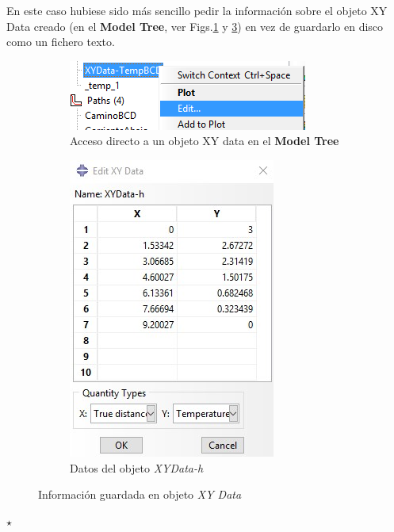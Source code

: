 \begin{itemize}
   En este caso hubiese sido más sencillo pedir la información sobre
   el objeto XY Data creado (en el \textbf{Model Tree}, ver
   Figs.\ref{post38} y \ref{post39}) en vez de guardarlo en disco como
   un fichero texto.
   \begin{figure}[!h]
     \centering
     \begin{subfigure}[!h]{0.45\textwidth}
       \includegraphics[width=\textwidth]{./body/images/post38}
       \caption{Acceso directo a un objeto XY data en el \textbf{Model
           Tree}}
       \label{post38}
     \end{subfigure}\quad%
     \begin{subfigure}[!h]{0.450\textwidth}
       \includegraphics[width=\textwidth]{./body/images/30b.jpg}
       \caption{Datos del objeto \textit{XYData-h}}
       \label{post39}
     \end{subfigure}%
     \caption{Información guardada en objeto \textit{XY Data}}
   \end{figure}
 \end{itemize}

 \hspace{20mm}\hrulefill$\star$\hrulefill\hspace{20mm}
